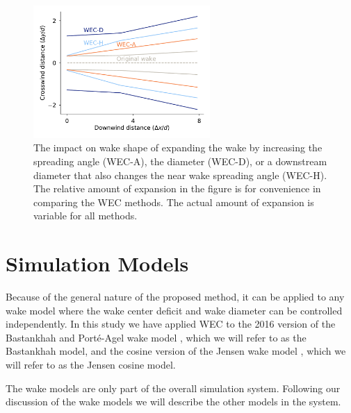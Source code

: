 \documentclass{jpconf}
\begin{document}
\begin{figure}[h]
	\centering
	\includegraphics[width=0.6\textwidth,trim={0, 0, 0, 2.0}]{wec-methods}
	\caption{The impact on wake shape of expanding the wake by increasing the spreading angle (WEC-A), the diameter (WEC-D), or a downstream diameter that also changes the near wake spreading angle (WEC-H). The relative amount of expansion in the figure is for convenience in comparing the WEC methods. The actual amount of expansion is variable for all methods.}
	\label{fig:wec-methods}
\end{figure}

\section{Simulation Models}\label{sec:models}
Because of the general nature of the proposed method, it can be applied to any wake model where the wake center deficit and wake diameter can be controlled independently. In this study we have applied WEC to the 2016 version of the Bastankhah and Port\'e-Agel wake model \cite{bastankhah2016}, which we will refer to as the Bastankhah model, and the cosine version of the Jensen wake model \cite{jensen1983}, which we will refer to as the Jensen cosine model. 

The wake models are only part of the overall simulation system. Following our discussion of the wake models we will describe the other models in the system.
\end{document}
